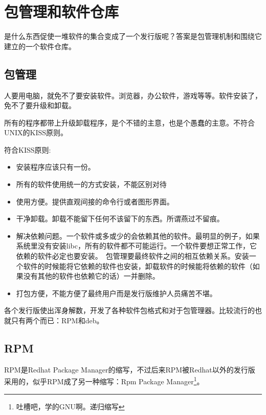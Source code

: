 \documentclass[amstex,twoside]{ctexbook}
\begin{document}
\section{包管理和软件仓库}

是什么东西促使一堆软件的集合变成了一个发行版呢？答案是包管理机制和围绕它建立的一个软件仓库。

\subsection{包管理}

人要用电脑，就免不了要安装软件。浏览器，办公软件，游戏等等。软件安装了，免不了要升级和卸载。

所有的程序都带上升级卸载程序，是个不错的主意，也是个愚蠢的主意。不符合UNIX的KISS原则。

符合KISS原则:
\begin{itemize}
\item 安装程序应该只有一份。
\item 所有的软件使用统一的方式安装，不能区别对待

\item 使用方便。提供直观间接的命令行或者图形界面。

\item 干净卸载。卸载不能留下任何不该留下的东西。所谓燕过不留痕。

\item 解决依赖问题。一个软件或多或少的会依赖其他的软件。最明显的例子，如果系统里没有安装libc，所有的软件都不可能运行。一个软件要想正常工作，它依赖的软件必定也要安装。　包管理要最终软件之间的相互依赖关系。安装一个软件的时候能将它依赖的软件也安装，卸载软件的时候能将依赖的软件（如果没有其他的软件也依赖它的话）一并删除。

\item 打包方便，不能方便了最终用户而是发行版维护人员痛苦不堪。

\end{itemize}

各个发行版使出浑身解数，开发了各种软件包格式和对于包管理器。比较流行的也就只有两个而已：RPM和deb。

\subsection*{RPM}

RPM是Redhat Package Manager的缩写，不过后来RPM被Redhat以外的发行版采用的，似乎RPM成了另一种缩写：Rpm Package Manager\footnote{吐槽吧，学的GNU啊。递归缩写}。
\end{document}
